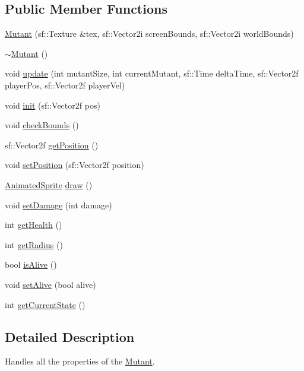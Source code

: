 \subsection*{Public Member Functions}
\begin{DoxyCompactItemize}
\item 
\hyperlink{class_mutant_a2c80776724cca166b639e5e433deda42}{Mutant} (sf\+::\+Texture \&tex, sf\+::\+Vector2i screen\+Bounds, sf\+::\+Vector2i world\+Bounds)
\item 
\hyperlink{class_mutant_a03dc2cf4d08ea08bea6cd4ded784dfc1}{$\sim$\+Mutant} ()
\item 
void \hyperlink{class_mutant_aa334f3574bc0a367e0cc722a900b35da}{update} (int mutant\+Size, int current\+Mutant, sf\+::\+Time delta\+Time, sf\+::\+Vector2f player\+Pos, sf\+::\+Vector2f player\+Vel)
\item 
void \hyperlink{class_mutant_a43fe449ecbb708a19095cd030b399cee}{init} (sf\+::\+Vector2f pos)
\item 
void \hyperlink{class_mutant_a46424e3134923fed261aec4cfeee43d5}{check\+Bounds} ()
\item 
sf\+::\+Vector2f \hyperlink{class_mutant_ab20f22800bae3c7587beb641248412ac}{get\+Position} ()
\item 
void \hyperlink{class_mutant_a10a34b2ddc9177b0da17fa8bc77d48c7}{set\+Position} (sf\+::\+Vector2f position)
\item 
\hyperlink{class_animated_sprite}{Animated\+Sprite} \hyperlink{class_mutant_ad085db34f2e45e82b6b7bb6bfc4be1c7}{draw} ()
\item 
void \hyperlink{class_mutant_a7632057c37a56ed27df3d692b5357c6a}{set\+Damage} (int damage)
\item 
int \hyperlink{class_mutant_ae80452778ea58cf79ff76a1a481712af}{get\+Health} ()
\item 
int \hyperlink{class_mutant_afb53c9562d5e98d5f6749024d09d132e}{get\+Radius} ()
\item 
bool \hyperlink{class_mutant_ab92626e4168187b7bf49073e0626e071}{is\+Alive} ()
\item 
void \hyperlink{class_mutant_ae31d5187569549ce0c6346c8bef31bd4}{set\+Alive} (bool alive)
\item 
int \hyperlink{class_mutant_a07b88089382dcc84f261ee3d3d9a009b}{get\+Current\+State} ()
\end{DoxyCompactItemize}


\subsection{Detailed Description}
Handles all the properties of the \hyperlink{class_mutant}{Mutant}. 



